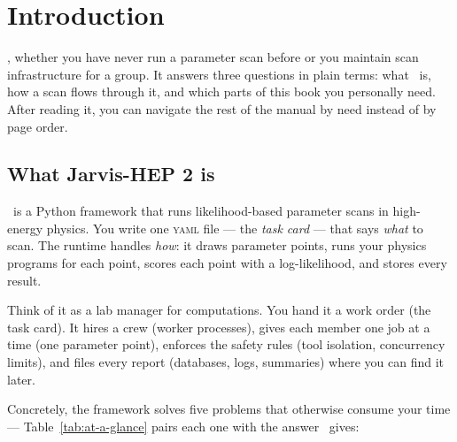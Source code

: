 \chapter{Introduction}
\label{ch:introduction}

, whether you have never run a parameter
scan before or you maintain scan infrastructure for a group. It answers three questions
in plain terms: what \Jtwo\ is, how a scan flows through it, and which parts of this
book you personally need. After reading it, you can navigate the rest of the manual by
need instead of by page order.

\section{What Jarvis-HEP 2 is}
\label{sec:what-it-does}

\Jtwo\ is a Python framework that runs likelihood-based parameter scans in high-energy
physics.\cite{Guo:2026kfy} You write one \textsc{yaml} file --- the \emph{task card} ---
that says \emph{what} to scan. The runtime handles \emph{how}: it draws parameter
points, runs your physics programs for each point, scores each point with a
log-likelihood, and stores every result.

Think of it as a lab manager for computations. You hand it a work
order (the task card). It hires a crew (worker processes), gives each member one job at
a time (one parameter point), enforces the safety rules (tool isolation, concurrency
limits), and files every report (databases, logs, summaries) where you can find it
later.

Concretely, the framework solves five problems that otherwise consume your time ---
Table~\ref{tab:at-a-glance} pairs each one with the answer \Jtwo\ gives:

